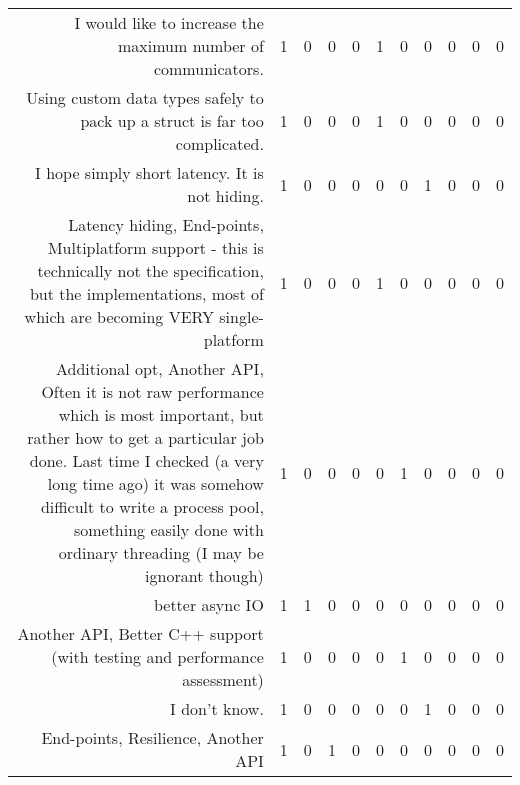 {\begin{landscape}
\begin{longtable}[htb]{r|c|c|c|c|c|c|c|c|c|c}
{I would like to increase the maximum number of communicators.} & 1 & 0 & 0 & 0 & 1 & 0 & 0 & 0 & 0 & 0 \\%
{Using custom data types safely to pack up a struct is far too complicated.} & 1 & 0 & 0 & 0 & 1 & 0 & 0 & 0 & 0 & 0 \\%
{I hope simply short latency.  It is not hiding.} & 1 & 0 & 0 & 0 & 0 & 0 & 1 & 0 & 0 & 0 \\%
{Latency hiding, End-points, Multiplatform support - this is technically not the specification, but the implementations, most of which are becoming VERY single-platform} & 1 & 0 & 0 & 0 & 1 & 0 & 0 & 0 & 0 & 0 \\%
{Additional opt, Another API, Often it is not raw performance which is most important, but rather how to get a particular job done.  Last time I checked (a very long time ago) it was somehow difficult to write a process pool, something easily done with ordinary threading (I may be ignorant though)} & 1 & 0 & 0 & 0 & 0 & 1 & 0 & 0 & 0 & 0 \\%
{better async IO} & 1 & 1 & 0 & 0 & 0 & 0 & 0 & 0 & 0 & 0 \\%
{Another API, Better C++ support (with testing and performance assessment)} & 1 & 0 & 0 & 0 & 0 & 1 & 0 & 0 & 0 & 0 \\%
{I don't know.} & 1 & 0 & 0 & 0 & 0 & 0 & 1 & 0 & 0 & 0 \\%
{End-points, Resilience, Another API} & 1 & 0 & 1 & 0 & 0 & 0 & 0 & 0 & 0 & 0 \\%
\hline%
\end{longtable}%
\end{landscape}}%
\clearpage%
